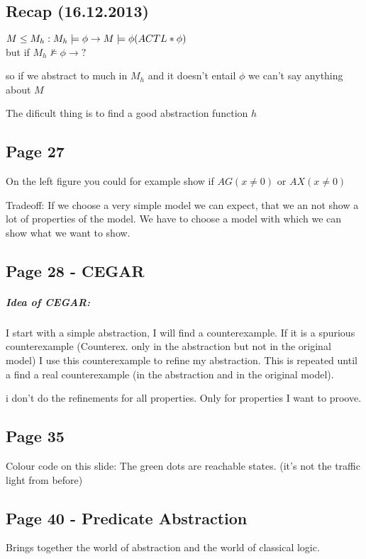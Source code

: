 \documentclass[a4paper]{article}
\newcommand{\entails}[1]{\models{#1}}
\begin{document}
\subsection{Recap (16.12.2013)}

$M \leq M_h :\\ M_h \entails{} \phi \rightarrow \\ M \entails{} \phi (ACTL*
\phi)$\\ but if $M_h \not \entails{} \phi \rightarrow ?$ 

so if we abstract to much in $M_h$ and it doesn't entail $\phi$ we can't say
anything about $M$

The dificult thing is to find a good abstraction function $h$

\subsection{Page 27}
On the left figure you could for example show if $AG(x \neq 0)$ or $AX(x \neq
0)$

Tradeoff: If we choose a very simple model we can expect, that we an not show a
lot of properties of the model. We have to choose a model with which we can show
what we want to show.


\subsection{Page 28 - CEGAR}
\subparagraph{Idea of CEGAR:} I start with a simple abstraction, I will find a
counterexample. If it is a spurious counterexample (Counterex. only in the
abstraction but not in the original model) I use this counterexample to
refine my abstraction. This is repeated until a find a real counterexample (in
the abstraction and in the original model).

i don't do the refinements for all properties. Only for properties I want to
proove.

\subsection{Page 35}
Colour code on this slide: The green dots are reachable states. (it's not the
traffic light from before)

\subsection{Page 40 - Predicate Abstraction}
Brings together the world of abstraction and the world of classical logic.
\end{document}
